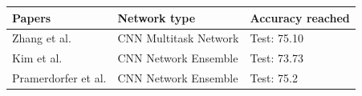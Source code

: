 \documentclass[10pt,twocolumn,letterpaper]{article}
\begin{document}
\begin{table}[h]
   \begin{center}
      \begin{tabular}{|C{2.2cm}|C{2.2cm}|C{1.6cm}|}
         \hline
         Papers                         & Network type          & Accuracy reached \\
         \hline\hline
         Zhang et al. \cite{Zhang}      & CNN Multitask Network & Test: 75.10      \\\hline
         Kim et al. \cite{Kim}          & CNN Network Ensemble  & Test: 73.73      \\\hline
         Pramerdorfer et al. \cite{147} & CNN Network Ensemble  & Test: 75.2       \\
         \hline
      \end{tabular}
   \end{center}
   \label{table:paperdiscarded}
\end{table}
\end{document}
